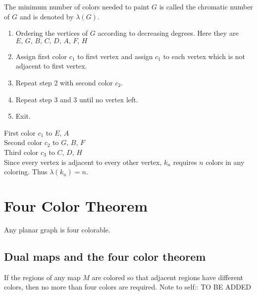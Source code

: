 \documentclass[12pt,oneside,a4paper]{book}
\theoremstyle{remark}
\theoremstyle{definition}
\begin{document}
\begin{itemize}
    The minimum number of colors needed to paint $ G $ is called the chromatic number of $ G $ and is denoted by $ \lambda(G) $.\\
    \begin{enumerate}
        \item Ordering the vertices of $ G $ according to decreasing degrees. Here they are $ E,\,G,\,B,\,C,\,D,\,A,\,F,\,H $
        \item Assign first color $ c_1 $ to first vertex and assign $ c_1 $ to each vertex which is not adjacent to first vertex.
        \item Repeat step 2 with second color $ c_2 $.
        \item Repeat step 3 and 3 until no vertex left.
        \item Exit.
    \end{enumerate}
    First color $ c_1 $ to $ E,\,A $\\
    Second color $ c_2 $ to $ G, \,B,\,F $\\
    Third color $ c_3 $ to $ C,\,D,\,H $\\
    Since every vertex is adjacent to every other vertex, $ k_n $ requires $ n $ colors in any coloring. Thus $ \lambda(k_n)=n $.
\end{itemize}
\section{Four Color Theorem}
Any planar graph is four colorable.
\subsection{Dual maps and the four color theorem}
If the regions of any map $ M $ are colored so that adjacent regions have different colors, then no more than four colors are required.
Note to self:: TO BE ADDED
\end{document}
